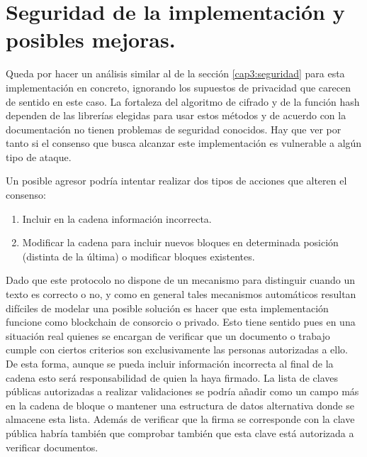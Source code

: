 \section{Seguridad de la implementación y posibles mejoras.}
Queda por hacer un análisis similar al de la sección \ref{cap3:seguridad} para esta implementación en concreto, ignorando los supuestos de privacidad que carecen de sentido en este caso. La fortaleza del algoritmo de cifrado y de la función hash dependen de las librerías elegidas para usar estos métodos y de acuerdo con la documentación no tienen problemas de seguridad conocidos.
Hay que ver por tanto si el consenso que busca alcanzar este implementación es vulnerable a algún tipo de ataque. 


Un posible agresor podría intentar realizar dos tipos de acciones que alteren el consenso:

\begin{enumerate}
\item Incluir en la cadena información incorrecta.  
\item Modificar la cadena para incluir nuevos bloques en determinada posición (distinta de la última) o modificar bloques existentes.
\end{enumerate}

Dado que este protocolo no dispone de un mecanismo para distinguir cuando un texto es correcto o no, y como en general tales mecanismos automáticos resultan difíciles de modelar una posible solución es hacer que esta implementación funcione como blockchain de consorcio o privado. Esto tiene sentido pues en una situación real quienes se encargan de verificar que un documento o trabajo cumple con ciertos criterios son exclusivamente las personas autorizadas a ello. De esta forma, aunque se pueda incluir información incorrecta al final de la cadena esto será responsabilidad de quien la haya firmado. La lista de claves públicas autorizadas a realizar validaciones se podría añadir como un campo más en la cadena de bloque o mantener una estructura de datos alternativa donde se almacene esta lista. Además de verificar que la firma se corresponde con la clave pública habría también que comprobar también que esta clave está autorizada a verificar documentos.

